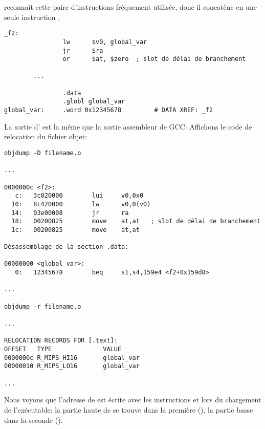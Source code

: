 \IDA reconnait cette paire d'instructions fréquement utilisée, donc il concatène en
une seule instruction .

\begin{lstlisting}[caption=GCC 4.4.5 -O3 (IDA),style=customasmMIPS]
_f2:
                lw      $v0, global_var
                jr      $ra
                or      $at, $zero	; slot de délai de branchement

		...

                .data
                .globl global_var
global_var:     .word 0x12345678         # DATA XREF: _f2
\end{lstlisting}

La sortie d' est la même que la sortie assembleur de GCC:
Affichons le code de relocation du fichier objet:

\begin{lstlisting}[caption=objdump,style=customasmMIPS]
objdump -D filename.o

...

0000000c <f2>:
   c:   3c020000        lui     v0,0x0
  10:   8c420000        lw      v0,0(v0)
  14:   03e00008        jr      ra
  18:   00200825        move    at,at	; slot de délai de branchement
  1c:   00200825        move    at,at

Désassemblage de la section .data:

00000000 <global_var>:
   0:   12345678        beq     s1,s4,159e4 <f2+0x159d8>

...

objdump -r filename.o

...

RELOCATION RECORDS FOR [.text]:
OFFSET   TYPE              VALUE
0000000c R_MIPS_HI16       global_var
00000010 R_MIPS_LO16       global_var

...

\end{lstlisting}

Nous voyons que l'adresse de  est écrite avec les instructions 
et  lors du chargement de l'exécutable:
la partie haute de  se trouve dans la première (), la partie
basse dans la seconde ().

